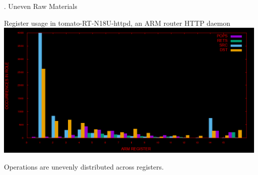 \documentclass[9pt]{beamer}
\begin{document}
\begin{frame}{\theframenumber. Uneven Raw Materials}

  \begin{center}
    Register usage in tomato-RT-N18U-httpd, an ARM router HTTP daemon
    \includegraphics[width=\textwidth]{../images/tomato.png}
    \end{center}
  Operations are unevenly distributed across registers.

\end{frame}


\end{document}
